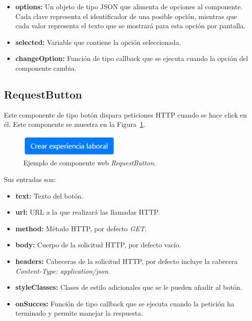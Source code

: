 \documentclass[a4paper, 12pt]{book}
\begin{document}
    \begin{itemize}
        \item \textbf{options:} Un objeto de tipo JSON que alimenta de opciones al componente. Cada clave representa el identificador de una posible opción, mientras que cada valor representa el texto que se mostrará para esta opción por pantalla.
        \item \textbf{selected:} Variable que contiene la opción seleccionada.
        \item \textbf{changeOption:} Función de tipo callback que se ejecuta cuando la opción del componente cambia.
    \end{itemize}

    \subsection{RequestButton}
    \label{subsec:wc_request_button}
    Este componente de tipo botón dispara peticiones HTTP cuando se hace click en él.
    Este componente se muestra en la Figura~\ref{fig:component_request_button}.

    \begin{figure}
        \centering
        \includegraphics[width=5cm, keepaspectratio]{img/RequestButton.PNG}
        \caption{Ejemplo de componente web \emph{RequestButton}.}\label{fig:component_request_button}
    \end{figure}

    Sus entradas son:

    \begin{itemize}
        \item \textbf{text:} Texto del botón.
        \item \textbf{url:} URL a la que realizará las llamadas HTTP.
        \item \textbf{method:} Método HTTP, por defecto \emph{GET}.
        \item \textbf{body:} Cuerpo de la solicitud HTTP, por defecto vacío.
        \item \textbf{headers:} Cabeceras de la solicitud HTTP, por defecto incluye la cabecera \emph{Content-Type: application/json}.
        \item \textbf{styleClasses:} Clases de estilo adicionales que se le pueden añadir al botón.
        \item \textbf{onSucces:} Función de tipo callback que se ejecuta cuando la petición ha terminado y permite manejar la respuesta.
    \end{itemize}
\end{document}
